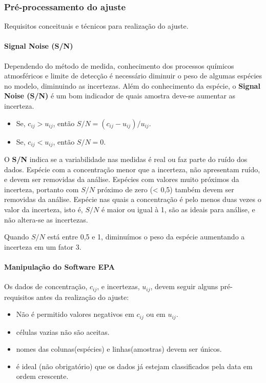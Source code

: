 \subsubsection{Pré-processamento do ajuste}
Requisitos conceituais e técnicos para realização do ajuste.

\paragraph{Signal Noise (S/N)}

Dependendo do método de medida, conhecimento dos processos químicos 
atmosféricos e limite de detecção é necessário diminuir o peso de algumas 
espécies no modelo, diminuindo as incertezas. 
Além do conhecimento da espécie, o \textbf{Signal Noise (S/N)} é um bom 
indicador de quais amostra deve-se aumentar as incerteza.

\begin{itemize}
  \item Se, $c_{ij} >  u_{ij}$, então $ S/N = (c_{ij} - u_{ij})/u_{ij}$.
  \item Se, $c_{ij} <  u_{ij}$, então $S/N = 0 $.
\end{itemize}

O \textbf{S/N} indica se a variabilidade nas medidas é real ou faz parte do 
ruído dos dados. 
Espécie com a concentração menor que a incerteza, não apresentam ruído, e devem 
ser removidas da análise. Espécies com valores muito próximos da incerteza, 
portanto com $S/N$ próximo de zero (< 0,5) também devem ser removidas da 
análise. 
Espécie nas quais a concentração é pelo menos duas vezes o valor da incerteza, 
isto é, $S/N$ é maior ou igual à 1, são as ideais para análise, 
e não altera-se as incertezas. 

Quando $S/N$ está entre 0,5 e 1, diminuímos o peso da espécie aumentando a 
incerteza em um fator 3.  

\paragraph{Manipulação do Software EPA}

Os dados de concentração, $c_{ij}$, e incertezas, $u_{ij}$, devem seguir 
alguns pré-requisitos antes da realização do ajuste:

\begin{itemize}
  \item Não é permitido valores negativos em $c_{ij}$ ou em $u_{ij}$.
  \item células vazias não são aceitas.
  \item nomes das colunas(espécies) e linhas(amostras) devem ser únicos.
  \item é ideal (não obrigatório) que os dados já estejam classificados 
        pela data em ordem crescente.
\end{itemize}

